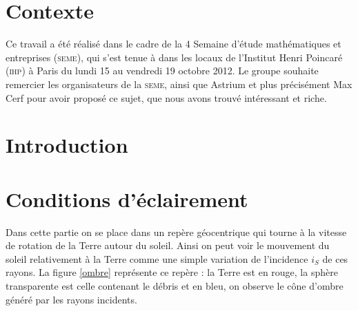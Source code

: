 \documentclass[a4paper,11pt]{article}
\numberwithin{section}{part}
\begin{document}
\section{Contexte}

Ce travail a été réalisé dans le cadre de la 4\ieme{} 
Semaine d'étude mathématiques et entreprises (\textsc{seme}), qui s'est tenue à
dans les locaux de l'Institut Henri Poincaré (\textsc{ihp}) à Paris du lundi 15
au vendredi 19 octobre 2012. Le groupe souhaite remercier les
organisateurs de la \textsc{seme}, ainsi que Astrium et plus précisément Max
Cerf pour avoir proposé ce sujet, que nous avons trouvé intéressant et
riche.




\section{Introduction}








\section{Conditions d'éclairement}

Dans cette partie on se place dans un rep\`ere g\'eocentrique qui tourne \`a la vitesse de rotation de la Terre autour du soleil. Ainsi on peut voir le mouvement du soleil relativement \`a la Terre comme une simple variation de l'incidence $i_S$ de ces rayons.  La figure \ref{ombre} repr\'esente ce rep\`ere : la Terre est en rouge, la sph\`ere transparente est celle contenant le d\'ebris et en bleu, on observe le c\^one d'ombre g\'en\'er\'e par les rayons incidents. 
\end{document}

